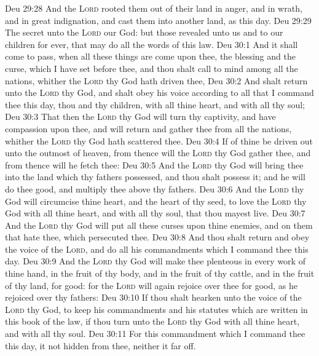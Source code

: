 \vs Deu 29:28 And the \textsc{Lord} rooted them out of their land in anger, and in wrath, and in great indignation, and cast them into another land, as  this day.
\vs Deu 29:29 The secret  unto the \textsc{Lord} our God: but those  revealed  unto us and to our children for ever, that  may do all the words of this law.
\vs Deu 30:1 And it shall come to pass, when all these things are come upon thee, the blessing and the curse, which I have set before thee, and thou shalt call  to mind among all the nations, whither the \textsc{Lord} thy God hath driven thee,
\vs Deu 30:2 And shalt return unto the \textsc{Lord} thy God, and shalt obey his voice according to all that I command thee this day, thou and thy children, with all thine heart, and with all thy soul;
\vs Deu 30:3 That then the \textsc{Lord} thy God will turn thy captivity, and have compassion upon thee, and will return and gather thee from all the nations, whither the \textsc{Lord} thy God hath scattered thee.
\vs Deu 30:4 If  of thine be driven out unto the outmost  of heaven, from thence will the \textsc{Lord} thy God gather thee, and from thence will he fetch thee:
\vs Deu 30:5 And the \textsc{Lord} thy God will bring thee into the land which thy fathers possessed, and thou shalt possess it; and he will do thee good, and multiply thee above thy fathers.
\vs Deu 30:6 And the \textsc{Lord} thy God will circumcise thine heart, and the heart of thy seed, to love the \textsc{Lord} thy God with all thine heart, and with all thy soul, that thou mayest live.
\vs Deu 30:7 And the \textsc{Lord} thy God will put all these curses upon thine enemies, and on them that hate thee, which persecuted thee.
\vs Deu 30:8 And thou shalt return and obey the voice of the \textsc{Lord}, and do all his commandments which I command thee this day.
\vs Deu 30:9 And the \textsc{Lord} thy God will make thee plenteous in every work of thine hand, in the fruit of thy body, and in the fruit of thy cattle, and in the fruit of thy land, for good: for the \textsc{Lord} will again rejoice over thee for good, as he rejoiced over thy fathers:
\vs Deu 30:10 If thou shalt hearken unto the voice of the \textsc{Lord} thy God, to keep his commandments and his statutes which are written in this book of the law,  if thou turn unto the \textsc{Lord} thy God with all thine heart, and with all thy soul.
\vs Deu 30:11 For this commandment which I command thee this day, it  not hidden from thee, neither  it far off.

